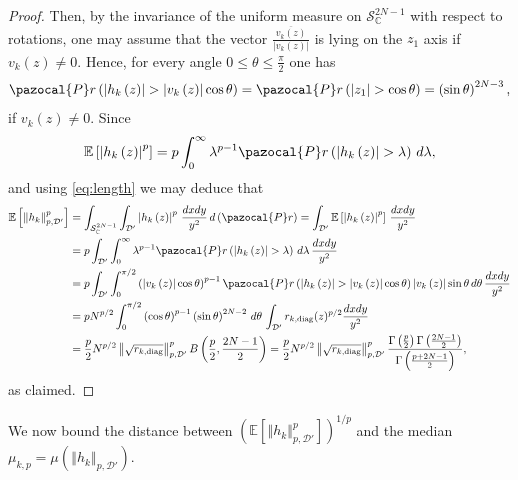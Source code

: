 \documentclass[12pt, a4paper]{amsart}
\newcommand{\tmop}[1]{\ensuremath{\operatorname{#1}}}
\theoremstyle{definition}
\newcommand {\1} {\mathbf{1}}
\newcommand{\prob}{\pazocal{P}r}
\newcommand {\Dc} {\mathcal{D}}
\newcommand{\Scc}{{\mathcal{S}}}
\numberwithin{equation}{section}
\begin{document}
\begin{proof}
Then, by the invariance of the uniform measure on $\Scc_{\mathbb{C}}^{2N-1}$ with respect to rotations,
one may assume that the vector $\frac{\overline{v_{k}\left(z\right)}}{\left|v_{k}\left(z\right)\right|}$
is lying on the $z_{1}$ axis if $v_k(z) \neq 0$. Hence, for every angle $0\le\theta\le\frac{\pi}{2}$
one has
\[
\prob\left(\left|h_{k}\left(z\right)\right|>\left|v_{k}\left(z\right)\right|\cos\theta\right)=\prob\left(\left|z_{1}\right|>\cos\theta\right)=\left(\sin\theta\right)^{2N-3},
\]
if $v_k(z) \neq 0$.
Since
\[
\mathbb{E}\left[\left|h_{k}\left(z\right)\right|^{p}\right]=p\int_{0}^{\infty}\lambda^{p-1}\prob\left(\left|h_{k}\left(z\right)\right|>\lambda\right)\,d\lambda,
\]
and using \eqref{eq:length}
we may deduce that
\begin{align*}
\mathbb{E}\left[\left\Vert h_{k}\right\Vert _{p,\Dc'}^{p}\right] & =\int_{\Scc_{\mathbb{C}}^{2N-1}}\int_{\Dc'}\left|h_{k}\left(z\right)\right|^{p}\,\frac{dxdy}{y^{2}}\,d\left(\prob\right)=\int_{\Dc'}\mathbb{E}\left[\left|h_{k}\left(z\right)\right|^{p}\right]\,\frac{dxdy}{y^{2}}\\
 & =p\int_{\Dc'}\int_{0}^{\infty}\lambda^{p-1}\prob\left(\left|h_{k}\left(z\right)\right|>\lambda\right)\,d\lambda\,\frac{dxdy}{y^{2}}\\
 & =p\int_{\Dc'}\int_{0}^{\pi/2}\left(\left|v_{k}\left(z\right)\right|\cos\theta\right)^{p-1}\prob\left(\left|h_{k}\left(z\right)\right|>\left|v_{k}\left(z\right)\right|\cos\theta\right)\left|v_{k}\left(z\right)\right|\sin\theta\,d\theta\,\frac{dxdy}{y^{2}}\\
 & =p N^{p/2} \int_{0}^{\pi/2}\left(\cos\theta\right)^{p-1}\left(\sin\theta\right)^{2N-2}\,d\theta\, \int_{\mathcal D'} r_{k,\tmop{diag}}(z)^{p/2} \frac{dxdy}{y^{2}}\\
     & =\frac{p}{2} N^{p/2} \left\Vert \sqrt{r_{k,\tmop{diag}}} \right\Vert_{p,\mathcal D'}^p B\left(\frac{p}{2},\frac{2N-1}{2}\right) =\frac{p}{2} N^{p/2} \left\Vert \sqrt{r_{k,\tmop{diag}}} \right\Vert_{p,\mathcal D'}^p \frac{\Gamma\left(\frac{p}{2}\right)\Gamma\left(\frac{2N-1}{2}\right)}{\Gamma\left(\frac{p+2N-1}{2}\right)},
\end{align*}
as claimed.
\end{proof}
%
We now bound the distance between $\left(\mathbb{E}\left[\left\Vert h_{k}\right\Vert _{p,\Dc'}^{p}\right]\right)^{1/p}$
and the median $\mu_{k,p}=\mu\left(\left\Vert h_{k}\right\Vert _{p,\Dc'}\right)$.
\end{document}
